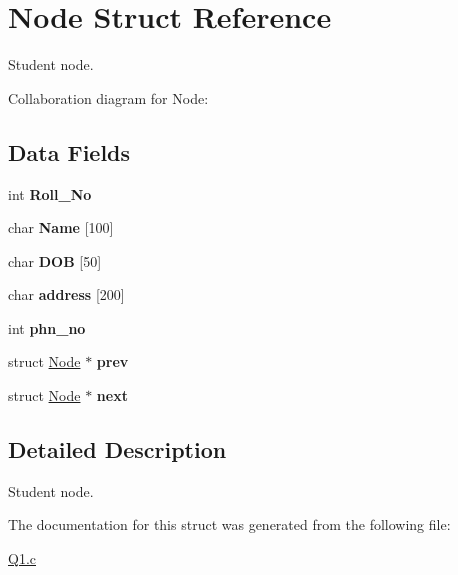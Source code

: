 \hypertarget{structNode}{}\section{Node Struct Reference}
\label{structNode}


Student node.  




Collaboration diagram for Node\+:
\subsection*{Data Fields}
\begin{DoxyCompactItemize}
\item 
\mbox{\label{structNode_aa88c25db6052fc5d0095ada54c4e90a4}} 
int {\bfseries Roll\+\_\+\+No}
\item 
\mbox{\label{structNode_afae9b1addde700ee9b69180676c1c498}} 
char {\bfseries Name} \mbox{[}100\mbox{]}
\item 
\mbox{\label{structNode_a6f120f76883472940cab92bc327f3781}} 
char {\bfseries D\+OB} \mbox{[}50\mbox{]}
\item 
\mbox{\label{structNode_a5108c644cce17eb5d81bd98a963022a6}} 
char {\bfseries address} \mbox{[}200\mbox{]}
\item 
\mbox{\label{structNode_aaa0503a0ff2607be78e4d350768d325f}} 
int {\bfseries phn\+\_\+no}
\item 
\mbox{\label{structNode_aea9fefc3628c3ce98b967e8addf06e88}} 
struct \hyperlink{structNode}{Node} $\ast$ {\bfseries prev}
\item 
\mbox{\label{structNode_af67b110ca1a258b793bf69d306929b22}} 
struct \hyperlink{structNode}{Node} $\ast$ {\bfseries next}
\end{DoxyCompactItemize}


\subsection{Detailed Description}
Student node. 

The documentation for this struct was generated from the following file\+:\begin{DoxyCompactItemize}
\item 
\hyperlink{Q1_8c}{Q1.\+c}\end{DoxyCompactItemize}

